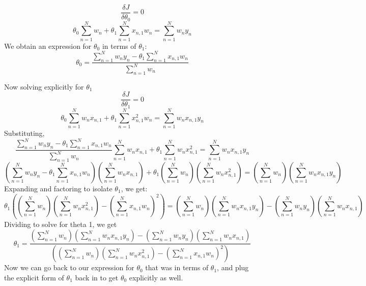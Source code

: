 \documentclass[11pt]{article}
\newcommand{\solution}[1]{{{\color{blue}{\bf Solution:} {#1}}}}
\begin{document}
\solution{
\[ \frac{\delta J}{\delta \theta_0} = 0 \]
\[ \theta_0\sum_{n=1}^{N}w_n + \theta_1\sum_{n=1}^{N}x_{n,1}w_{n} = \sum_{n=1}^{N}w_{n}y_{n} \]
We obtain an expression for $\theta_0$ in terms of $\theta_1$:
\[\theta_0 = \frac{\sum_{n=1}^{N}w_ny_n - \theta_1\sum_{n=1}^{N}x_{n,1}w_n}{\sum_{n=1}^{N}w_n} \]

Now solving explicitly for $\theta_1$
\[ \frac{\delta J}{\delta \theta_1} = 0 \]
\[\theta_0\sum_{n=1}^{N}w_nx_{n,1} + \theta_1\sum_{n=1}^{N}x_{n,1}^{2}w_n = \sum_{n=1}^{N}w_nx_{n,1}y_n \]
Substituting, 
\[ \frac{\sum_{n=1}^{N}w_ny_n - \theta_1\sum_{n=1}^{N}x_{n,1}w_{n}}{\sum_{n=1}^{N}w_{n}}\sum_{n=1}^{N}w_{n}x_{n,1} +  \theta_1\sum_{n=1}^{N}w_nx_{n,1}^{2} = \sum_{n=1}^{N}w_{n}x_{n,1}y_n \]
\[(\sum_{n=1}^{N}w_ny_n - \theta_1\sum_{n=1}^{N}x_{n,1}w_{n})(\sum_{n=1}^{N}w_{n}x_{n,1}) + \theta_{1} (\sum_{n=1}^{N}w_n)(\sum_{n=1}^{N}w_nx_{n,1}^{2}) = (\sum_{n=1}^{N}w_n)(\sum_{n=1}^{N}w_nx_{n,1}y_n) \]
Expanding and factoring to isolate $\theta_1$, we get:
\[\theta_1( (\sum_{n=1}^{N}w_n)(\sum_{n=1}^{N} w_nx_{n,1}^{2}) -  (\sum_{n=1}^{N}x_{n,1}w_n)^2     ) = (\sum_{n=1}^{N}w_n)(\sum_{n=1}^{N}w_nx_{n,1}y_n) - (\sum_{n=1}^{N}w_ny_n)(\sum_{n=1}^{N}w_nx_{n,1}) \]
Dividing to solve for theta 1, we get
\[\theta_1 = \frac{(\sum_{n=1}^{N}w_n)(\sum_{n=1}^{N}w_nx_{n,1}y_n) - (\sum_{n=1}^{N}w_ny_n)(\sum_{n=1}^{N}w_nx_{n,1})}{( (\sum_{n=1}^{N}w_n)(\sum_{n=1}^{N} w_nx_{n,1}^{2}) -  (\sum_{n=1}^{N}x_{n,1}w_n)^2     )} \]
Now we can go back to our expression for $\theta_0$ that was in terms of $\theta_1$, and plug the explicit form of $\theta_1$ back in to get $\theta_0$ explicitly as well.
}

\vspace{1cm}
\end{document}
